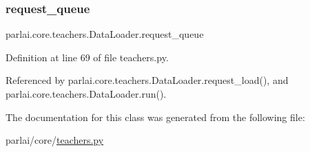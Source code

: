\subsubsection{\texorpdfstring{request\+\_\+queue}{request\_queue}}
{\footnotesize\ttfamily parlai.\+core.\+teachers.\+Data\+Loader.\+request\+\_\+queue}



Definition at line 69 of file teachers.\+py.



Referenced by parlai.\+core.\+teachers.\+Data\+Loader.\+request\+\_\+load(), and parlai.\+core.\+teachers.\+Data\+Loader.\+run().



The documentation for this class was generated from the following file\+:\begin{DoxyCompactItemize}
\item 
parlai/core/\hyperlink{teachers_8py}{teachers.\+py}\end{DoxyCompactItemize}
